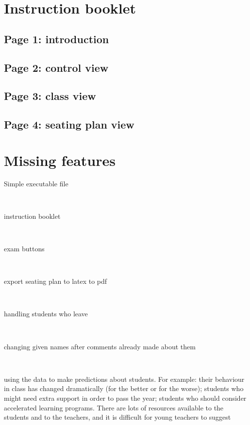 \documentclass[10pt]{article}
\begin{document}
\section{Instruction booklet} \label{instructions}

\subsection{Page 1: introduction}

\subsection{Page 2: control view}

\subsection{Page 3: class view}

\subsection{Page 4: seating plan view}


\section{Missing features} \label{notdone}

Simple executable file

\

instruction booklet

\

exam buttons

\

export seating plan to latex to pdf

\

handling students who leave

\

changing given names after comments already made about them

\

using the data to make predictions about students. For example: their behaviour in class has changed dramatically (for the better or for the worse); students who might need extra support in order to pass the year; students who should consider accelerated learning programs. There are lots of resources available to the students and to the teachers, and it is difficult for young teachers to suggest
\end{document}
